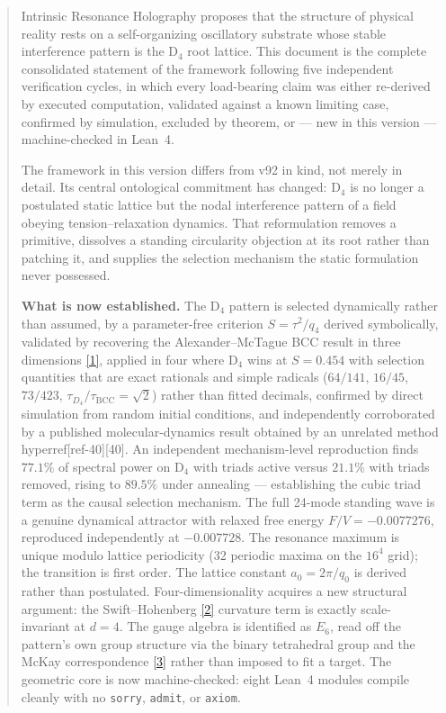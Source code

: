 \documentclass[a4paper,11pt]{article}
\begin{document}
\begin{abstract}
Intrinsic Resonance Holography proposes that the structure of physical reality rests on a self-organizing oscillatory substrate whose stable interference pattern is the D$_4$ root lattice. This document is the complete consolidated statement of the framework following five independent verification cycles, in which every load-bearing claim was either re-derived by executed computation, validated against a known limiting case, confirmed by simulation, excluded by theorem, or --- new in this version --- machine-checked in Lean~4.

The framework in this version differs from v92 in kind, not merely in detail. Its central ontological commitment has changed: D$_4$ is no longer a postulated static lattice but the nodal interference pattern of a field obeying tension--relaxation dynamics. That reformulation removes a primitive, dissolves a standing circularity objection at its root rather than patching it, and supplies the selection mechanism the static formulation never possessed.

\textbf{What is now established.} The D$_4$ pattern is selected dynamically rather than assumed, by a parameter-free criterion $S=\tau^2/q_4$ derived symbolically, validated by recovering the Alexander--McTague BCC result in three dimensions \hyperref[ref-1]{[1]}, applied in four where D$_4$ wins at $S=0.454$ with selection quantities that are exact rationals and simple radicals ($64/141$, $16/45$, $73/423$, $\tau_{D_4}/\tau_{\mathrm{BCC}}=\sqrt{2}$) rather than fitted decimals, confirmed by direct simulation from random initial conditions, and independently corroborated by a published molecular-dynamics result obtained by an unrelated method \\hyperref[ref-40]{[40]}. An independent mechanism-level reproduction finds $77.1\%$ of spectral power on D$_4$ with triads active versus $21.1\%$ with triads removed, rising to $89.5\%$ under annealing --- establishing the cubic triad term as the causal selection mechanism. The full 24-mode standing wave is a genuine dynamical attractor with relaxed free energy $F/V=-0.0077276$, reproduced independently at $-0.007728$. The resonance maximum is unique modulo lattice periodicity (32 periodic maxima on the $16^4$ grid); the transition is first order. The lattice constant $a_0=2\pi/q_0$ is derived rather than postulated. Four-dimensionality acquires a new structural argument: the Swift--Hohenberg \hyperref[ref-2]{[2]} curvature term is exactly scale-invariant at $d=4$. The gauge algebra is identified as $E_6$, read off the pattern's own group structure via the binary tetrahedral group and the McKay correspondence \hyperref[ref-3]{[3]} rather than imposed to fit a target. The geometric core is now machine-checked: eight Lean~4 modules compile cleanly with no \texttt{sorry}, \texttt{admit}, or \texttt{axiom}.


\end{abstract}
\end{document}
